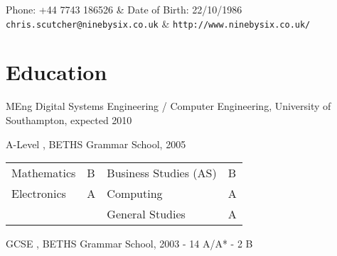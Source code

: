 \documentclass[overlapped,line,letterpaper]{res}
\begin{document}

\setlength{\leftmargini}{0em}
\setlength{\leftmargin}{1.5cm}
\setlength{\rightmargin}{1.5cm}
\setlength{\textheight}{800pt}
\setlength{\voffset}{-0.5in}
\renewcommand{\labelitemi}{}

\renewcommand{\namefont}{\large\textbf}



\begin{resume}

\begin{ncolumn}{2}
  Phone: +44 7743 186526                & Date of Birth: 22/10/1986 \\
  {\tt chris.scutcher@ninebysix.co.uk}  & {\tt \verb+http://www.ninebysix.co.uk/+}
\end{ncolumn}


\section{\bf Education}
MEng Digital Systems Engineering / Computer Engineering, University of
Southampton, expected 2010

A-Level , BETHS Grammar School, 2005						\\
\hspace*{1cm}
\begin{tabulary}{\textwidth}{p{4cm}p{0.5cm}p{4cm}p{0.5cm}}
Mathematics	&	B	&	Business Studies (AS)	&	B	\\
Electronics	&	A	&	Computing		&	A	\\
		&		&	General Studies		&	A	\\
\end{tabulary}

GCSE , BETHS Grammar School, 2003	- 14 A/A* - 2  B




\end{resume}
\end{document}
